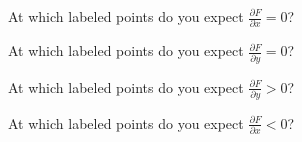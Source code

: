 \documentclass{ximera}
\begin{document}
\begin{exercise}
At which labeled points do you expect $\frac{\partial F}{\partial x} = 0$?
\begin{selectAll}
\end{selectAll}
\end{exercise}


\begin{exercise}
At which labeled points do you expect $\frac{\partial F}{\partial y} = 0$?
\begin{selectAll}
\end{selectAll}
\end{exercise}



\begin{exercise}
At which labeled points do you expect $\frac{\partial F}{\partial y} > 0$?
\begin{selectAll}
\end{selectAll}
\end{exercise}


\begin{exercise}
At which labeled points do you expect $\frac{\partial F}{\partial x} < 0$?
\begin{selectAll}
\end{selectAll}
\end{exercise}
\end{document}
